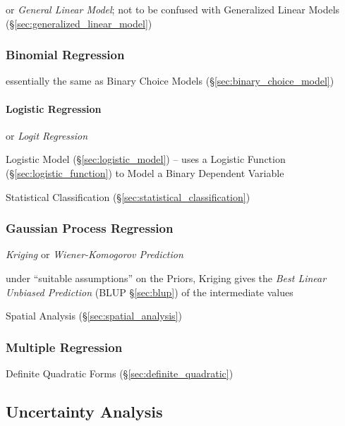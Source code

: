 or \emph{General Linear Model}; not to be confused with Generalized Linear
Models (\S\ref{sec:generalized_linear_model})



\subsubsection{Binomial Regression}\label{sec:binomial_regression}

essentially the same as Binary Choice Models (\S\ref{sec:binary_choice_model})



\paragraph{Logistic Regression}\label{sec:logistic_regression}\hfill

or \emph{Logit Regression}

Logistic Model (\S\ref{sec:logistic_model}) -- uses a Logistic Function
(\S\ref{sec:logistic_function}) to Model a Binary Dependent Variable

Statistical Classification (\S\ref{sec:statistical_classification})



\subsubsection{Gaussian Process Regression}
\label{sec:gaussian_process_regression}

\emph{Kriging} or \emph{Wiener-Komogorov Prediction}

under ``suitable assumptions'' on the Priors, Kriging gives the \emph{Best
  Linear Unbiased Prediction} (BLUP \S\ref{sec:blup}) of the intermediate values

\fist Spatial Analysis (\S\ref{sec:spatial_analysis})



\subsubsection{Multiple Regression}\label{sec:multiple_regression}

Definite Quadratic Forms (\S\ref{sec:definite_quadratic})



\subsection{Uncertainty Analysis}\label{sec:uncertainty_analysis}


